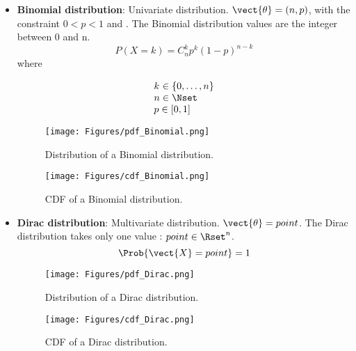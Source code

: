 {\begin{itemize}
\item {\bf Binomial distribution}: Univariate distribution. $\vect{\theta} = (n,p)$, with the constraint $0<p<1$ and . The Binomial distribution values are the integer between 0 and n.
\begin{equation}
\displaystyle P(X = k) = C_n^k p^k (1-p)^{{n-k}}
\end{equation}
where
\begin{equation}
\begin{array}{@{}l@{}}
k^{\strut} \in \{0, \hdots, n\} \\
n \in \Nset \\
p \in [0,1]
\end{array}
\end{equation}



\begin{figure}[H]
\begin{minipage}{8cm}
\begin{center}
\texttt{[image: Figures/pdf\_Binomial.png]}
\caption{Distribution of a Binomial distribution.}
\label{PDFBinomial}
\end{center}
\end{minipage}
\hfill
\begin{minipage}{8cm}
\begin{center}
\texttt{[image: Figures/cdf\_Binomial.png]}
\caption{CDF of a Binomial distribution.}
\label{CDFBinomial}
\end{center}
\end{minipage}
\end{figure}


\item {\bf Dirac distribution}: Multivariate distribution. $\vect{\theta} = point$. The Dirac distribution takes only one value : $point\in\Rset^n$.
\begin{equation}
\Prob{\vect{X} = point} = 1
\end{equation}

\begin{figure}[H]
\begin{minipage}{8cm}
\begin{center}
\texttt{[image: Figures/pdf\_Dirac.png]}
\caption{Distribution of a Dirac distribution.}
\label{PDFDirac}
\end{center}
\end{minipage}
\hfill
\begin{minipage}{8cm}
\begin{center}
\texttt{[image: Figures/cdf\_Dirac.png]}
\caption{CDF of a Dirac distribution.}
\label{CDFDirac}
\end{center}
\end{minipage}
\end{figure}





\end{itemize}}
